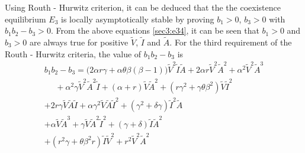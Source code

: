 \documentclass[12pt]{article}
\numberwithin{equation}{section}
\begin{document}
\begin{enumerate}[i).]
Using Routh - Hurwitz criterion, it can be deduced that the the coexistence equilibrium $E_3$ is locally asymptotically stable by proving $b_1>0$, $b_3>0$ with $b_1b_2-b_3>0$. From the above equations \eqref{sec3:e34}, it can be seen that $b_1>0$ and $b_3>0$ are always true for positive $\tilde V$, $\tilde I$ and $\tilde A$. For the third requirement of the Routh - Hurwitz criteria, the value of $b_1b_2-b_3$ is
\begin{equation}\label{sec3:e35}
\begin{split}
b_1b_2-b_3 = \bigg(2 \alpha r \gamma + \alpha \theta \beta (\beta - 1)\bigg)\tilde V^2 \tilde I \tilde A  + 2 \alpha r\tilde V^2 \tilde A^2 + \alpha^2\tilde V^2\tilde A^3  \\
~~~~~~+ \alpha^2 \gamma\tilde V^2 \tilde A^2 \tilde I  +(\alpha + r)\tilde V \tilde A^2  + (r\gamma^2 + \gamma \theta \beta^2)\tilde V \tilde I^2  \\
+ 2r\gamma\tilde V \tilde A \tilde I  + \alpha \gamma^2\tilde V \tilde A \tilde I^2  + (\gamma^2+\delta \gamma)\tilde I^2\tilde A\\
+ \alpha\tilde V \tilde A^3  + \gamma\tilde V \tilde A^2\tilde I^2  + (\gamma + \delta)\tilde I \tilde A^2 \\ 
+(r^2\gamma + \theta \beta^2 r)\tilde I \tilde V^2 +r^2\tilde V^2\tilde A^2 
\end{split}
\end{equation}
\end{enumerate}
\end{document}
